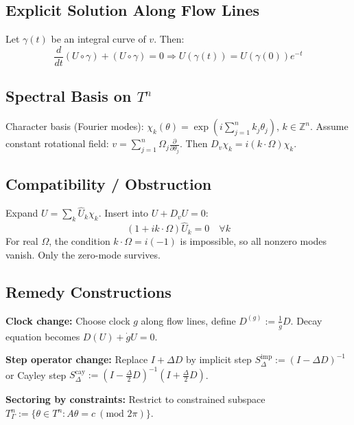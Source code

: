 \documentclass[12pt, oneside]{article}
\begin{document}
\subsection{Explicit Solution Along Flow Lines}

Let $\gamma(t)$ be an integral curve of $v$. Then:
\begin{equation}
\frac{d}{dt} (U \circ \gamma) + (U \circ \gamma) = 0 \Rightarrow U(\gamma(t)) = U(\gamma(0)) e^{-t}
\end{equation}

\subsection{Spectral Basis on $T^n$}

Character basis (Fourier modes): $\chi_k(\theta) = \exp(i\sum_{j=1}^n k_j \theta_j)$, $k \in \mathbb{Z}^n$. Assume constant rotational field: $v = \sum_{j=1}^n \Omega_j \frac{\partial}{\partial \theta_j}$. Then $D_v \chi_k = i(k \cdot \Omega) \chi_k$.

\subsection{Compatibility / Obstruction}

Expand $U = \sum_k \widehat{U}_k \chi_k$. Insert into $U + D_v U = 0$:
\begin{equation}
(1 + i k \cdot \Omega) \widehat{U}_k = 0 \quad \forall k
\end{equation}
For real $\Omega$, the condition $k \cdot \Omega = i(-1)$ is impossible, so all nonzero modes vanish. Only the zero-mode survives.

\subsection{Remedy Constructions}

\textbf{Clock change:} Choose clock $g$ along flow lines, define $D^{(g)} := \frac{1}{\dot{g}} D$. Decay equation becomes $D(U) + \dot{g} U = 0$.

\textbf{Step operator change:} Replace $I + \Delta D$ by implicit step $S_{\Delta}^{\text{imp}} := (I - \Delta D)^{-1}$ or Cayley step $S_{\Delta}^{\text{cay}} := (I - \frac{\Delta}{2} D)^{-1} (I + \frac{\Delta}{2} D)$.

\textbf{Sectoring by constraints:} Restrict to constrained subspace $T_\Gamma^n := \{\theta \in T^n : A\theta = c \ (\text{mod } 2\pi)\}$.
\end{document}
